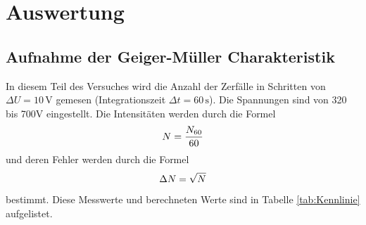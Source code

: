 \section{Auswertung}
\subsection{Aufnahme der Geiger-Müller Charakteristik}
In diesem Teil des Versuches wird die Anzahl der Zerfälle in Schritten von $\Delta U= 10\,\text{V}$ gemesen (Integrationszeit $\Delta t= 60\,\text{s}$).
Die Spannungen sind von 320 bis 700V eingestellt. 
Die Intensitäten werden durch die Formel
\begin{equation}
  N = \frac{N_{60}}{60}\\
 \end{equation}
 und deren Fehler werden durch die Formel
 \begin{equation}
  \Delta N = \sqrt{N}\\
 \end{equation}
 bestimmt.
 Diese Messwerte und berechneten Werte sind in Tabelle \ref{tab:Kennlinie} aufgelistet. 
